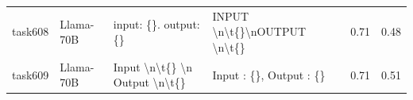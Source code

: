 \begin{longtable}{@{}p{0.8cm\tiny}p{1cm\tiny}p{4.1cm\ttfamily\tiny}p{4.1cm\ttfamily\tiny}p{0.8cm\tiny}p{0.8cm\tiny}@{}}
task608   & Llama-70B  & input: \{\}. output: \{\}                                                                                                                                                                                                                                                                                                                                                                                                                                                                                               & INPUT \textbackslash{}n\textbackslash{}t\{\}\textbackslash{}nOUTPUT \textbackslash{}n\textbackslash{}t\{\}                                                                                                                                                                                                                                                                                                                                                                                                                                                                        & 0.71 & 0.48 \\
task609   & Llama-70B  & Input \textbackslash{}n\textbackslash{}t\{\} \textbackslash{}n Output \textbackslash{}n\textbackslash{}t\{\}                                                                                                                                                                                                                                                                                                                                                                                                            & Input : \{\}, Output : \{\}                                                                                                                                                                                                                                                                                                                                                                                                                                                                                                                                                       & 0.71 & 0.51 \\

\end{longtable}
